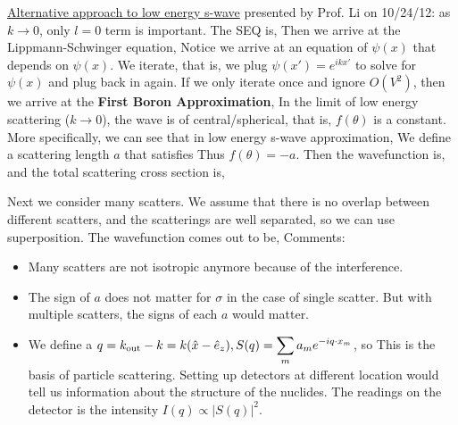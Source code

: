 \documentclass{school-22.101-notes}
\begin{document}
\uline{Alternative approach to low energy s-wave} presented by Prof. Li on 10/24/12: as $k\to 0$, only $l=0$ term is important. The SEQ is, 
Then we arrive at the Lippmann-Schwinger equation, 
Notice we arrive at an equation of $\psi(x)$ that depends on $\psi(x)$. We iterate, that is, we plug $\psi(x') = e^{ikx'}$ to solve for $\psi(x)$ and plug back in again. If we only iterate once and ignore $O(V^2)$, then we arrive at the \textbf{First Boron Approximation}, 
In the limit of low energy scattering ($k \to 0$), the wave is of central/spherical, that is, $f(\theta)$ is a constant. More specifically, we can see that in low energy s-wave approximation, 
We define a scattering length $a$ that satisfies 
Thus $f(\theta) = -a$. Then the wavefunction is, 
and the total scattering cross section is,


Next we consider many scatters. We assume that there is no overlap between different scatters, and the scatterings are well separated, so we can use superposition. The wavefunction comes out to be,
Comments: 
\begin{itemize}
\item Many scatters are not isotropic anymore because of the interference. 
\item The sign of $a$ does not matter for $\sigma$ in the case of single scatter. But with multiple scatters, the signs of each $a$ would matter. 
\item We define a $\displaystyle q = k_{\mathrm{out}} - k = k(\hat{x} - \hat{e}_z), S(q) = \displaystyle\sum_m a_m e^{-i q \cdot x_m}$, so 
  This is the basis of particle scattering. Setting up detectors at different location would tell us information about the structure of the nuclides. The readings on the detector is the intensity $I(q) \propto |S(q)|^2$. 
\end{itemize}
\end{document}
